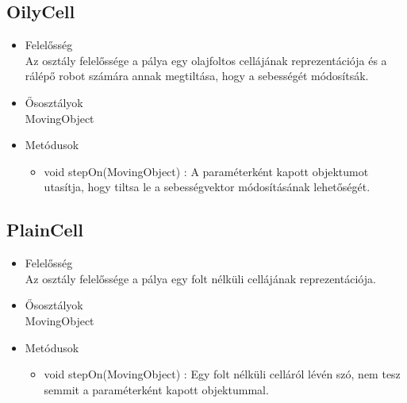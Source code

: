 \subsection{OilyCell}
\begin{itemize}
	\item Felelősség\\
	Az osztály felelőssége a pálya egy olajfoltos cellájának reprezentációja és a rálépő robot számára annak megtiltása, hogy a sebességét módosítsák.
	\item Ősosztályok\\
	MovingObject
	\item Metódusok
	\begin{itemize}
		\item void stepOn(MovingObject) : A paraméterként kapott objektumot utasítja, hogy tiltsa le a sebességvektor módosításának lehetőségét.
	\end{itemize}
\end{itemize}

\subsection{PlainCell}
\begin{itemize}
	\item Felelősség\\
	Az osztály felelőssége a pálya egy folt nélküli cellájának reprezentációja.
	\item Ősosztályok\\
	MovingObject
	\item Metódusok
	\begin{itemize}
		\item void stepOn(MovingObject) : Egy folt nélküli celláról lévén szó, nem tesz semmit a paraméterként kapott objektummal.
	\end{itemize}
\end{itemize}

